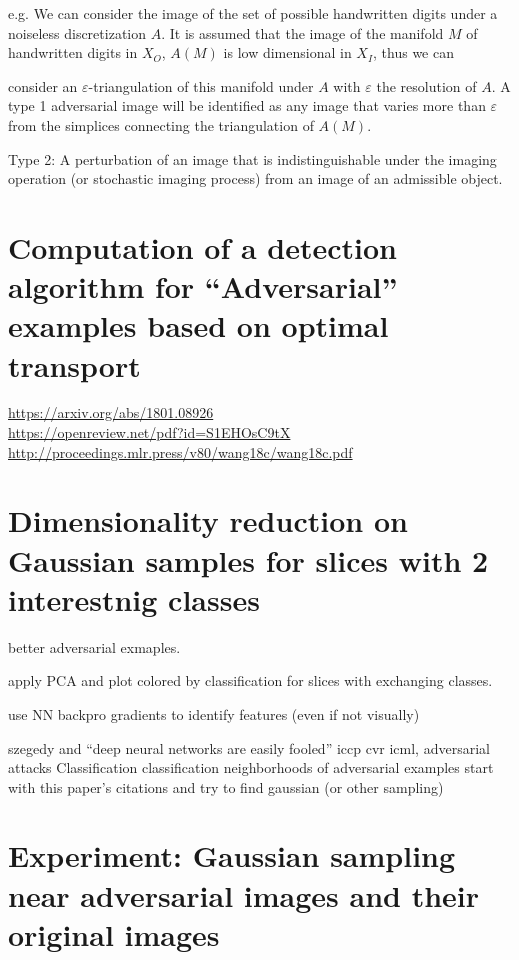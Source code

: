 \documentclass[10pt]{extarticle}\usepackage[letterpaper]{geometry}
\newcommand{\e}{\varepsilon}
\begin{document}
\vspace{.3cm}

e.g. We can consider the image of the
set of possible handwritten digits under a noiseless
discretization $A$. It is assumed that the image of the manifold $M$ of
handwritten digits in $X_O$, $A(M)$ is low dimensional in $X_I$, thus we can 

\vspace{.3cm}

consider an $\e$-triangulation of this manifold under $A$ with $\e$
the resolution of $A$. A type 1 adversarial image will
be identified as any image that varies more than $\e$ from the
simplices connecting the triangulation of $A(M)$. 

Type 2: A perturbation of an image that is indistinguishable under the
imaging operation (or stochastic imaging process) from an image of an
admissible object.






\section{Computation of a detection algorithm for ``Adversarial''
  examples based on optimal transport}



\url{https://arxiv.org/abs/1801.08926}\\
\url{https://openreview.net/pdf?id=S1EHOsC9tX}\\
\url{http://proceedings.mlr.press/v80/wang18c/wang18c.pdf}\\

\section{Dimensionality reduction on Gaussian samples for slices with
  2 interestnig classes}

better adversarial exmaples. 

apply PCA and plot colored by classification for slices with
exchanging classes.

use NN backpro gradients to identify features (even if not visually)


szegedy and ``deep neural networks are easily fooled'' iccp cvr icml,
adversarial attacks Classification classification neighborhoods of
adversarial examples start with this paper's citations and try to find gaussian (or
other sampling)

\section{Experiment: Gaussian sampling near adversarial images and
  their original images}
\end{document}

